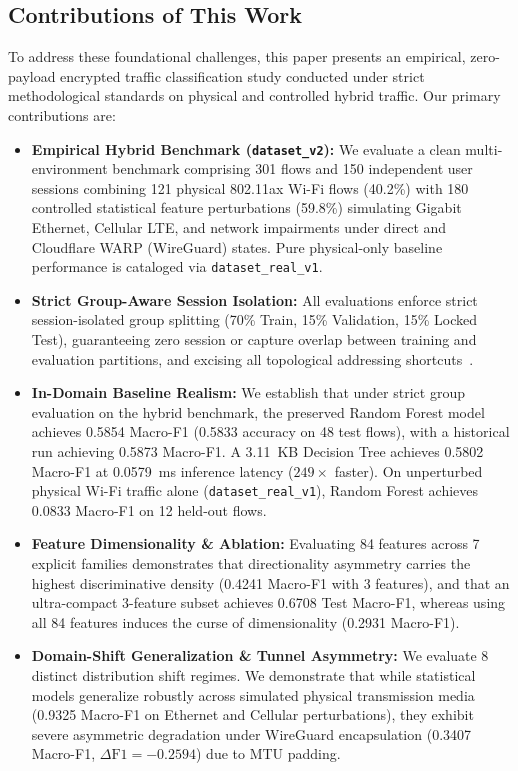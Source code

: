 \documentclass[conference]{IEEEtran}
\begin{document}
\subsection{Contributions of This Work}
To address these foundational challenges, this paper presents an empirical, zero-payload encrypted traffic classification study conducted under strict methodological standards on physical and controlled hybrid traffic. Our primary contributions are:
\begin{itemize}
    \item \textbf{Empirical Hybrid Benchmark (\texttt{dataset\_v2}):} We evaluate a clean multi-environment benchmark comprising 301 flows and 150 independent user sessions combining 121 physical 802.11ax Wi-Fi flows (40.2\%) with 180 controlled statistical feature perturbations (59.8\%) simulating Gigabit Ethernet, Cellular LTE, and network impairments under direct and Cloudflare WARP (WireGuard) states. Pure physical-only baseline performance is cataloged via \texttt{dataset\_real\_v1}.
    \item \textbf{Strict Group-Aware Session Isolation:} All evaluations enforce strict session-isolated group splitting (70\% Train, 15\% Validation, 15\% Locked Test), guaranteeing zero session or capture overlap between training and evaluation partitions, and excising all topological addressing shortcuts~\cite{arp2022dos}.
    \item \textbf{In-Domain Baseline Realism:} We establish that under strict group evaluation on the hybrid benchmark, the preserved Random Forest model achieves 0.5854 Macro-F1 (0.5833 accuracy on 48 test flows), with a historical run achieving 0.5873 Macro-F1. A 3.11~KB Decision Tree achieves 0.5802 Macro-F1 at 0.0579~ms inference latency ($249\times$ faster). On unperturbed physical Wi-Fi traffic alone (\texttt{dataset\_real\_v1}), Random Forest achieves 0.0833 Macro-F1 on 12 held-out flows.
    \item \textbf{Feature Dimensionality \& Ablation:} Evaluating 84 features across 7 explicit families demonstrates that directionality asymmetry carries the highest discriminative density (0.4241 Macro-F1 with 3 features), and that an ultra-compact 3-feature subset achieves 0.6708 Test Macro-F1, whereas using all 84 features induces the curse of dimensionality (0.2931 Macro-F1).
    \item \textbf{Domain-Shift Generalization \& Tunnel Asymmetry:} We evaluate 8 distinct distribution shift regimes. We demonstrate that while statistical models generalize robustly across simulated physical transmission media (0.9325 Macro-F1 on Ethernet and Cellular perturbations), they exhibit severe asymmetric degradation under WireGuard encapsulation (0.3407 Macro-F1, $\Delta\text{F1} = -0.2594$) due to MTU padding.

\end{itemize}
\end{document}
